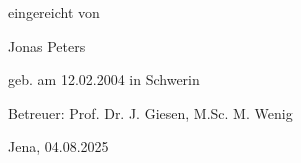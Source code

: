 \begin{titlepage}
    {eingereicht von\par}
    {\large Jonas Peters\par} %
    {geb. am 12.02.2004 in Schwerin\par} %
    \vspace{0.5cm}

    {Betreuer: Prof. Dr. J. Giesen, M.Sc. M. Wenig\par} %
    \vfill %

    {Jena, 04.08.2025\par} %

\end{titlepage}

% 